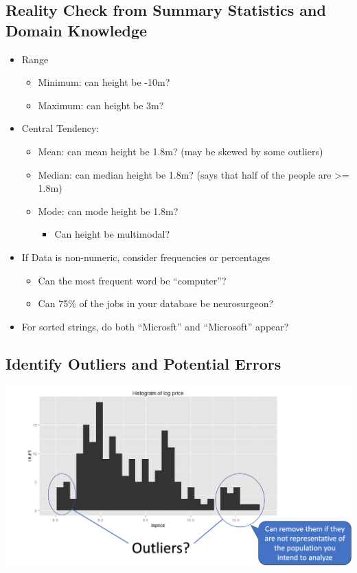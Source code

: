 \documentclass[11pt]{article}
\theoremstyle{definition}
\begin{document}
\subsection{Reality Check from Summary Statistics and Domain Knowledge}
\begin{itemize}
    \item Range
    \begin{itemize}
        \item Minimum: can height be -10m?
        \item Maximum: can height be 3m?
    \end{itemize}
    \item Central Tendency:
    \begin{itemize}
        \item Mean: can mean height be 1.8m? (may be skewed by some outliers)
        \item Median: can median height be 1.8m? (says that half of the people are >= 1.8m)
        \item Mode: can mode height be 1.8m?
        \begin{itemize}
            \item Can height be multimodal?
        \end{itemize}
    \end{itemize}
    \item If Data is non-numeric, consider frequencies or percentages
    \begin{itemize}
        \item Can the most frequent word be “computer”?
        \item Can 75\% of the jobs in your database be neurosurgeon?
    \end{itemize}
    \item For sorted strings, do both “Microsft” and “Microsoft” appear?
\end{itemize}
\subsection{Identify Outliers and Potential Errors}
\includegraphics[width=\textwidth]{16.png}
\end{document}
